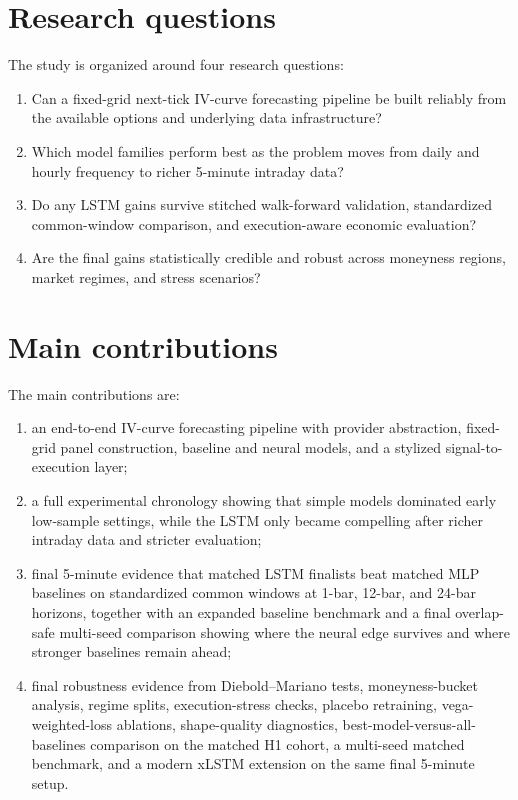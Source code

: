 \documentclass[12pt]{report}
\begin{document}
\section{Research questions}
The study is organized around four research questions:
\begin{enumerate}[leftmargin=1.4cm]
    \item Can a fixed-grid next-tick IV-curve forecasting pipeline be built reliably from the available options and underlying data infrastructure?
    \item Which model families perform best as the problem moves from daily and hourly frequency to richer 5-minute intraday data?
    \item Do any LSTM gains survive stitched walk-forward validation, standardized common-window comparison, and execution-aware economic evaluation?
    \item Are the final gains statistically credible and robust across moneyness regions, market regimes, and stress scenarios?
\end{enumerate}

\section{Main contributions}
The main contributions are:
\begin{enumerate}[leftmargin=1.4cm]
    \item an end-to-end IV-curve forecasting pipeline with provider abstraction, fixed-grid panel construction, baseline and neural models, and a stylized signal-to-execution layer;
    \item a full experimental chronology showing that simple models dominated early low-sample settings, while the LSTM only became compelling after richer intraday data and stricter evaluation;
    \item final 5-minute evidence that matched LSTM finalists beat matched MLP baselines on standardized common windows at 1-bar, 12-bar, and 24-bar horizons, together with an expanded baseline benchmark and a final overlap-safe multi-seed comparison showing where the neural edge survives and where stronger baselines remain ahead;
    \item final robustness evidence from Diebold--Mariano tests, moneyness-bucket analysis, regime splits, execution-stress checks, placebo retraining, vega-weighted-loss ablations, shape-quality diagnostics, best-model-versus-all-baselines comparison on the matched H1 cohort, a multi-seed matched benchmark, and a modern xLSTM extension on the same final 5-minute setup.
\end{enumerate}
\end{document}
